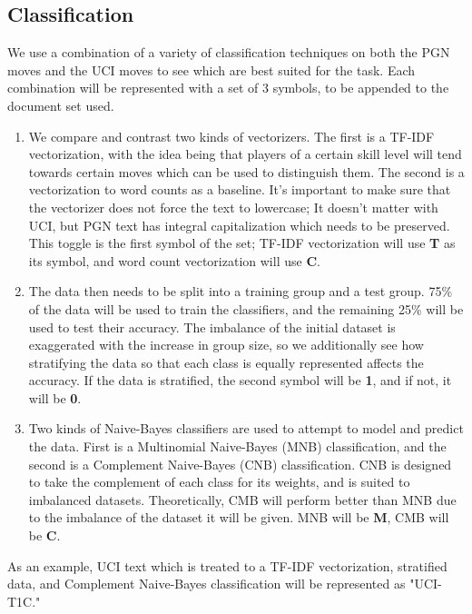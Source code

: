 \documentclass[conference]{IEEEtran}
\begin{document}
\subsection{Classification}
We use a combination of a variety of classification techniques on both the PGN moves and the UCI moves to see which are best suited for the task. Each combination will be represented with a set of 3 symbols, to be appended to the document set used.
\begin{enumerate}
\item We compare and contrast two kinds of vectorizers. The first is a TF-IDF vectorization, with the idea being that players of a certain skill level will tend towards certain moves which can be used to distinguish them. The second is a vectorization to word counts as a baseline. It's important to make sure that the vectorizer does not force the text to lowercase; It doesn't matter with UCI, but PGN text has integral capitalization which needs to be preserved. This toggle is the first symbol of the set; TF-IDF vectorization will use \textbf{T} as its symbol, and word count vectorization will use \textbf{C}.
\item The data then needs to be split into a training group and a test group. 75\% of the data will be used to train the classifiers, and the remaining 25\% will be used to test their accuracy. The imbalance of the initial dataset is exaggerated with the increase in group size, so we additionally see how stratifying the data so that each class is equally represented affects the accuracy. If the data is stratified, the second symbol will be \textbf{1}, and if not, it will be \textbf{0}.
\item Two kinds of Naive-Bayes classifiers are used to attempt to model and predict the data. First is a Multinomial Naive-Bayes (MNB) classification, and the second is a Complement Naive-Bayes (CNB) classification. CNB is designed to take the complement of each class for its weights, and is suited to imbalanced datasets. Theoretically, CMB will perform better than MNB due to the imbalance of the dataset it will be given. MNB will be \textbf{M}, CMB will be \textbf{C}.
\end{enumerate}

As an example, UCI text which is treated to a TF-IDF vectorization, stratified data, and Complement Naive-Bayes classification will be represented as "UCI-T1C."

\end{document}
